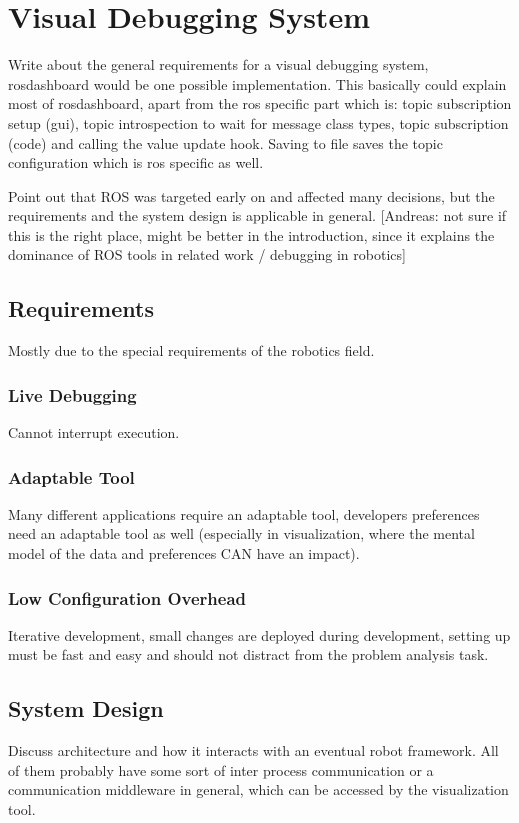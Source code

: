 \chapter{Visual Debugging System}
\label{visual_debugging_system}

Write about the general requirements for a visual debugging system, rosdashboard would be one possible implementation. This basically could explain most of rosdashboard, apart from the ros specific part which is: topic subscription setup (gui), topic introspection to wait for message class types, topic subscription (code) and calling the value update hook. Saving to file saves the topic configuration which is ros specific as well.

Point out that ROS was targeted early on and affected many decisions, but the requirements and the system design is applicable in general. [Andreas: not sure if this is the right place, might be better in the introduction, since it explains the dominance of ROS tools in related work / debugging in robotics]

\section{Requirements}
Mostly due to the special requirements of the robotics field.
\subsection{Live Debugging}
Cannot interrupt execution.
\subsection{Adaptable Tool}
Many different applications require an adaptable tool, developers preferences need an adaptable tool as well (especially in visualization, where the mental model of the data and preferences CAN have an impact).
\subsection{Low Configuration Overhead}
Iterative development, small changes are deployed during development, setting up must be fast and easy and should not distract from the problem analysis task.

\section{System Design}
Discuss architecture and how it interacts with an eventual robot framework. All of them probably have some sort of inter process communication or a communication middleware in general, which can be accessed by the visualization tool.

